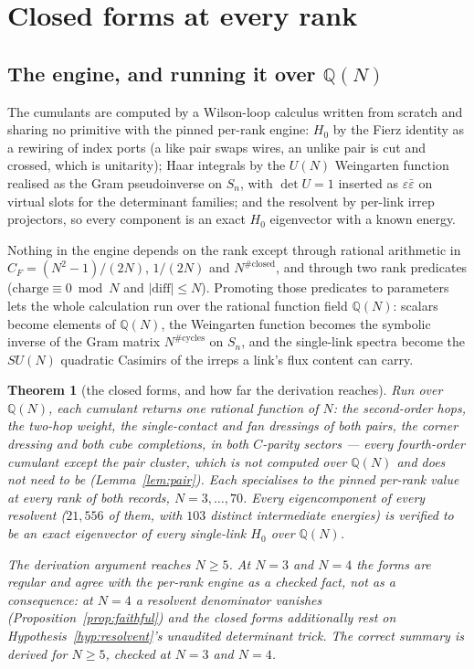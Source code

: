 \documentclass[11pt]{article}
\newtheorem{theorem}{Theorem}[section]
\theoremstyle{definition}
\theoremstyle{remark}
\newcommand{\CF}{C_F}
\newcommand{\Q}{\mathbb{Q}}
\newcommand{\chk}[1]{}
\begin{document}
\section{Closed forms at every rank}\label{sec:qn}

\subsection{The engine, and running it over $\Q(N)$}

The cumulants are computed by a Wilson-loop calculus written from scratch and
sharing no primitive with the pinned per-rank engine: $H_0$ by the Fierz
identity as a rewiring of index ports (a like pair swaps wires, an unlike pair
is cut and crossed, which is unitarity); Haar integrals by the $U(N)$
Weingarten function realised as the Gram pseudoinverse on $S_n$, with $\det
U=1$ inserted as $\varepsilon\bar\varepsilon$ on virtual slots for the
determinant families; and the resolvent by per-link irrep projectors, so every
component is an exact $H_0$ eigenvector with a known energy.

Nothing in the engine depends on the rank except through rational arithmetic in
$\CF=(N^2-1)/(2N)$, $1/(2N)$ and $N^{\#\mathrm{closed}}$, and through two rank
predicates ($\text{charge}\equiv0\bmod N$ and $|\mathrm{diff}|\le N$).
Promoting those predicates to parameters lets the whole calculation run over
the rational function field $\Q(N)$: scalars become elements of $\Q(N)$, the
Weingarten function becomes the symbolic inverse of the Gram matrix
$N^{\#\mathrm{cycles}}$ on $S_n$, and the single-link spectra become the
$SU(N)$ quadratic Casimirs of the irreps a link's flux content can carry.

\begin{theorem}[the closed forms, and how far the derivation reaches]\label{thm:closed}
Run over $\Q(N)$, each cumulant returns \emph{one} rational function of $N$:
the second-order hops, the two-hop weight, the single-contact and fan dressings
of both pairs, the corner dressing and both cube completions, in both
$C$-parity sectors --- every fourth-order cumulant except the pair cluster,
which is not computed over $\Q(N)$ and does not need to be
(Lemma~\ref{lem:pair}). Each specialises to the pinned per-rank value at every
rank of both records, $N=3,\dots,70$. Every eigencomponent of every resolvent
($21{,}556$ of them, with $103$ distinct intermediate energies) is verified to
be an exact eigenvector of every single-link $H_0$ over $\Q(N)$.

The derivation argument reaches $N\ge5$. At $N=3$ and $N=4$ the forms are
regular and \emph{agree} with the per-rank engine as a checked fact, not as a
consequence: at $N=4$ a resolvent denominator vanishes
(Proposition~\ref{prop:faithful}) and the closed forms additionally rest on
Hypothesis~\ref{hyp:resolvent}'s unaudited determinant trick. The correct
summary is \emph{derived for $N\ge5$, checked at $N=3$ and
$N=4$}.\chk{the specialisation argument's certificate: every eigencomponent an exact H0 eigenvector over Q(N), every Haar family balanced with n <= 3, every flux audited, and the one resolvent denominator vanishing at an integer rank >= 4 is at N = 4}
\end{theorem}
\end{document}
